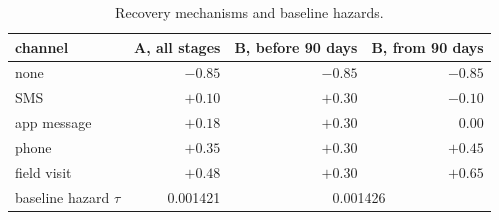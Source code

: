 \begin{table}[!htbp]
\centering
\caption{Recovery mechanisms and baseline hazards.}
\label{tab:campaignworlds}
\small
\begin{tabular}{lrrr}
\toprule
channel & A, all stages & B, before 90 days & B, from 90 days \\
\midrule
none & $-0.85$ & $-0.85$ & $-0.85$ \\
SMS & $+0.10$ & $+0.30$ & $-0.10$ \\
app message & $+0.18$ & $+0.30$ & $0.00$ \\
phone & $+0.35$ & $+0.30$ & $+0.45$ \\
field visit & $+0.48$ & $+0.30$ & $+0.65$ \\
baseline hazard $\tau$ & 0.001421 & \multicolumn{2}{c}{0.001426} \\
\bottomrule
\end{tabular}
\end{table}

